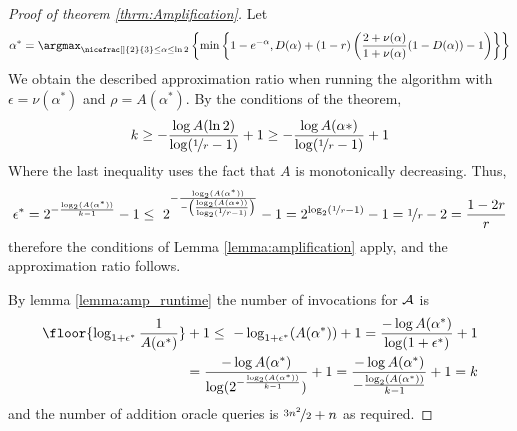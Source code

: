 \begin{proof}[Proof of theorem \ref{thrm:Amplification}]
	Let $$\alpha^*  = \argmax _{\nicefrac[]{2}{3}\leq \alpha \leq \ln{2}} \left\{ \min \left\{ 1-e^{-\alpha},D(\alpha)+(1-r)\left( \frac{2+\nu(\alpha)}{1+\nu(\alpha)} (1-D(\alpha)) -1\right)\right\}\right\}$$
	We obtain the described approximation ratio when running the algorithm
	with $\epsilon = \nu(\alpha^*)$ and $\rho = A(\alpha^*)$. 
	By the conditions of the theorem,
	$$k \geq -\frac{\log A(\ln 2)} { \log(\nicefrac[]{1}{r} -1 ) } +1 \geq-\frac{\log A(\alpha*)} { \log(\nicefrac[]{1}{r} -1 ) } +1 $$
	Where the last inequality uses the fact that $A$ is monotonically decreasing.  Thus, 
	$$\epsilon^* = 2 ^{-\frac{\log_2 (A(\alpha^*))}{k-1}} -1 \leq \
	2 ^{-\frac{ \log_2(A(\alpha^*))}{  -\left(\frac{\log_2(A(\alpha* ))}{\log_2(\nicefrac[]{1}{r}-1)} \right) }} -1  = 
	2^{\log_2(\nicefrac[]{1}{r}-1)} -1 = \nicefrac[]{1}{r}-2 = \frac{1-2r}{r} $$
	therefore the conditions of Lemma \ref{lemma:amplification} apply, 
	and the approximation ratio follows. 
	
	By lemma \ref{lemma:amp_runtime} the number of invocations for $\mathcal{A}$ 
	is 
	\begin{align*}
	\floor{\log_{1+\epsilon^*} \frac{1}{A(\alpha^*)}}+1 \leq \
	-\log_{1+\epsilon^*} (A(\alpha^*)) +1 =
	\frac{-\log A(\alpha^*)} {\log(1+\epsilon^*)} +1 \\
	= \frac{-\log {A(\alpha^*)}} {\log(2 ^{-\frac{\log_2 (A(\alpha^*))}{k-1}} )} +1 
	= \frac{-\log {A(\alpha^*)}} {-\frac{\log_2 (A(\alpha^*))}{k-1}} +1
	= k \end{align*}
	and the number of addition oracle queries is $\nicefrac[]{3n^2}{2} + n $ 
	as required.
	
\end{proof}

